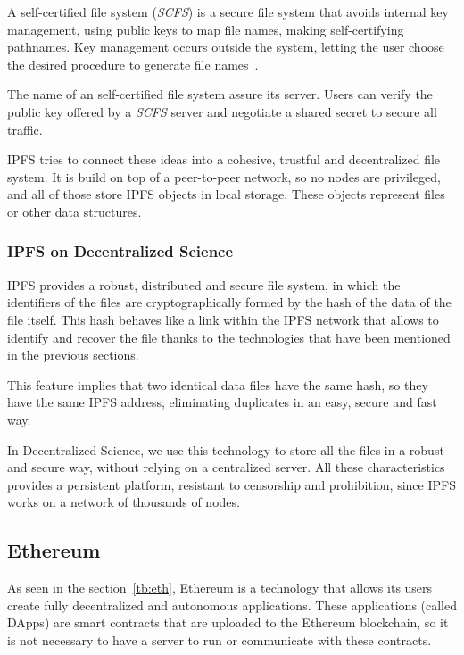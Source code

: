 A self-certified file system (\emph{SCFS}) is a secure file system that avoids
internal key management, using public keys to map file names, making
self-certifying pathnames. Key management occurs outside the system, letting the
user choose the desired procedure to generate file
names~\cite{mazieres2000self}.

The name of an self-certified file system assure its server. Users can verify
the public key offered by a \emph{SCFS} server and negotiate a shared secret to
secure all traffic.

IPFS tries to connect these ideas into a cohesive, trustful and decentralized
file system. It is build on top of a peer-to-peer network, so no nodes are
privileged, and all of those store IPFS objects in local storage. These objects
represent files or other data structures.

\subsubsection*{IPFS on Decentralized Science}

IPFS provides a robust, distributed and secure file system, in which the
identifiers of the files are cryptographically formed by the hash of the data of
the file itself. This hash behaves like a link within the IPFS network that
allows to identify and recover the file thanks to the technologies that have
been mentioned in the previous sections.

This feature implies that two identical data files have the same hash, so they
have the same IPFS address, eliminating duplicates in an easy, secure and fast
way.

In Decentralized Science, we use this technology to store all the files in a
robust and secure way, without relying on a centralized server. All these
characteristics provides a persistent platform, resistant to censorship and
prohibition, since IPFS works on a network of thousands of nodes.

\subsection{Ethereum}
\label{tech:sec:ethereum}
As seen in the section~\ref{tb:eth}, Ethereum is a technology that allows its
users create fully decentralized and autonomous applications. These applications
(called DApps) are smart contracts that are uploaded to the Ethereum blockchain,
so it is not necessary to have a server to run or communicate with these
contracts.

